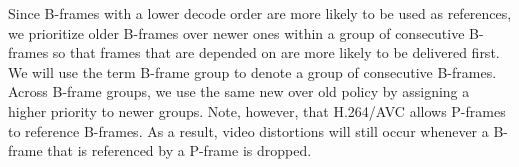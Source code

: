 Since B-frames with a lower decode order are more likely to be used as references, we prioritize older B-frames over newer ones within a group of consecutive B-frames so that frames that are depended on are more likely to be delivered first. We will use the term B-frame group to denote a group of consecutive B-frames. Across B-frame groups, we use the same new over old policy by assigning a higher priority to newer groups. Note, however, that H.264/AVC allows P-frames to reference B-frames. As a result, video distortions will still occur whenever a B-frame that is referenced by a P-frame is dropped.






